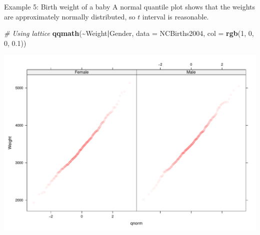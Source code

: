 \documentclass[
  ignorenonframetext,
]{beamer}
\newenvironment{Shaded}{\begin{snugshade}}{\end{snugshade}}
\newcommand{\AttributeTok}[1]{\textcolor[rgb]{0.13,0.29,0.53}{#1}}
\newcommand{\CommentTok}[1]{\textcolor[rgb]{0.56,0.35,0.01}{\textit{#1}}}
\newcommand{\DecValTok}[1]{\textcolor[rgb]{0.00,0.00,0.81}{#1}}
\newcommand{\FloatTok}[1]{\textcolor[rgb]{0.00,0.00,0.81}{#1}}
\newcommand{\FunctionTok}[1]{\textcolor[rgb]{0.13,0.29,0.53}{\textbf{#1}}}
\newcommand{\NormalTok}[1]{#1}
\newcommand{\SpecialCharTok}[1]{\textcolor[rgb]{0.81,0.36,0.00}{\textbf{#1}}}
\begin{document}
\begin{frame}[fragile]{Example 5: Birth weight of a baby}
\protect\hypertarget{example-5-birth-weight-of-a-baby-2}{}
A normal quantile plot shows that the weights are approximately normally
distributed, so \(t\) interval is reasonable. \normalsize

\begin{Shaded}
\begin{Highlighting}[]
\CommentTok{\# Using lattice}
\FunctionTok{qqmath}\NormalTok{(}\SpecialCharTok{\textasciitilde{}}\NormalTok{Weight}\SpecialCharTok{|}\NormalTok{Gender, }\AttributeTok{data =}\NormalTok{ NCBirths2004, }\AttributeTok{col =} \FunctionTok{rgb}\NormalTok{(}\DecValTok{1}\NormalTok{, }\DecValTok{0}\NormalTok{, }\DecValTok{0}\NormalTok{, }\FloatTok{0.1}\NormalTok{))}
\end{Highlighting}
\end{Shaded}

\begin{center}\includegraphics[width=0.7\linewidth,height=0.5\textheight]{Week10A_files/figure-beamer/unnamed-chunk-59-1} \end{center}
\normalsize
\end{frame}
\end{document}
